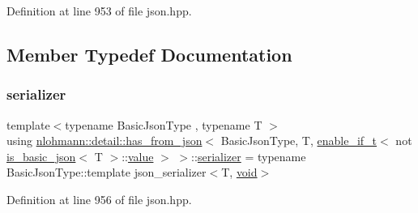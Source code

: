 Definition at line 953 of file json.\+hpp.



\subsection{Member Typedef Documentation}
\mbox{\label{structnlohmann_1_1detail_1_1has__from__json_3_01_basic_json_type_00_01_t_00_01enable__if__t_3_01e29213c543deddccc314d19cbaf9f3b4_ab17cea1be422b8985fc19942809560ed}} 
\subsubsection{\texorpdfstring{serializer}{serializer}}
{\footnotesize\ttfamily template$<$typename Basic\+Json\+Type , typename T $>$ \\
using \mbox{\hyperlink{structnlohmann_1_1detail_1_1has__from__json}{nlohmann\+::detail\+::has\+\_\+from\+\_\+json}}$<$ Basic\+Json\+Type, T, \mbox{\hyperlink{namespacenlohmann_1_1detail_a02bcbc878bee413f25b985ada771aa9c}{enable\+\_\+if\+\_\+t}}$<$ not \mbox{\hyperlink{structnlohmann_1_1detail_1_1is__basic__json}{is\+\_\+basic\+\_\+json}}$<$ T $>$\+::\mbox{\hyperlink{structnlohmann_1_1detail_1_1has__from__json_3_01_basic_json_type_00_01_t_00_01enable__if__t_3_01e29213c543deddccc314d19cbaf9f3b4_afb638d592883301228bcad21d83bf4aa}{value}} $>$ $>$\+::\mbox{\hyperlink{structnlohmann_1_1detail_1_1has__from__json_3_01_basic_json_type_00_01_t_00_01enable__if__t_3_01e29213c543deddccc314d19cbaf9f3b4_ab17cea1be422b8985fc19942809560ed}{serializer}} =  typename Basic\+Json\+Type\+::template json\+\_\+serializer$<$T, \mbox{\hyperlink{namespacenlohmann_1_1detail_a59fca69799f6b9e366710cb9043aa77d}{void}}$>$}



Definition at line 956 of file json.\+hpp.



